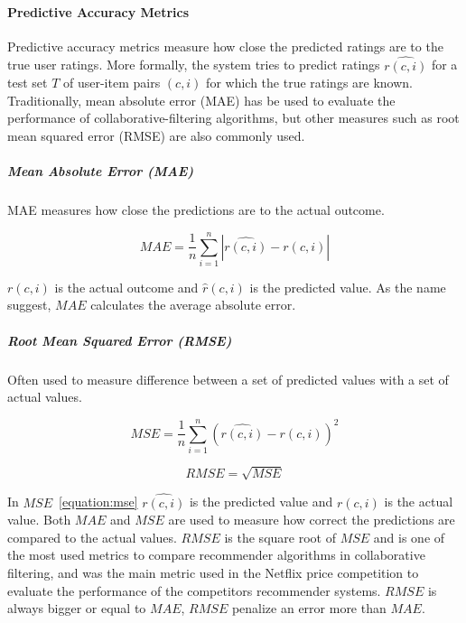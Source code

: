 \paragraph{Predictive Accuracy Metrics}

Predictive accuracy metrics measure how close the predicted ratings are to the
true user ratings. More formally, the system tries to predict ratings
$\hat{r(c,i)}$ for a test set $T$ of user-item pairs $(c, i)$ for which the
true ratings are known. Traditionally, mean absolute error (MAE) has be used to
evaluate the performance of collaborative-filtering algorithms, but other
measures such as root mean squared error (RMSE) are also commonly used.

\subparagraph{Mean Absolute Error (MAE)}

MAE measures how close the predictions are to the actual outcome.

\begin{equation}
    MAE = \frac{1}{n}\sum_{i=1}^{n}{|\hat{r(c,i)}-r(c,i)|}
    \label{equation:mae}
\end{equation}

$r(c,i)$ is the actual outcome and $\hat{r}(c,i)$ is the predicted value.
As the name suggest, $MAE$ calculates the average absolute error.

\subparagraph{Root Mean Squared Error (RMSE)}

Often used to measure difference between a set of predicted values with a set of actual values.

\begin{equation}
    MSE = \frac{1}{n}\sum_{i=1}^{n}{(\hat{r(c,i)} - r(c,i))^{2}}
    \label{equation:mse}
\end{equation}

\begin{equation}
    RMSE = \sqrt{MSE}
    \label{equation:rmse}
\end{equation}

In $MSE$~\ref{equation:mse} $\hat{r(c,i)}$ is the predicted value and $r(c,i)$ is the actual value.
Both $MAE$ and $MSE$ are used to measure how correct the predictions are compared to the actual values.
$RMSE$ is the square root of $MSE$ and is one of the most used metrics to compare recommender algorithms in collaborative filtering, and was the main metric used in the Netflix price competition to evaluate the performance of the competitors recommender systems. $RMSE$ is always bigger or equal to $MAE$, $RMSE$ penalize an error more than $MAE$.

